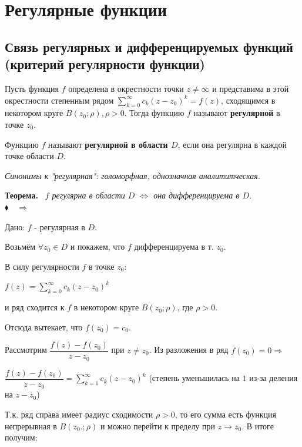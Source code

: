 \documentclass[a4paper, 12pt]{report}
\begin{document}
\par\bigskip
\section{Регулярные функции}

\subsection{Связь регулярных и дифференцируемых функций (критерий регулярности функции)}
Пусть функция $f$ определена в окрестности точки $z \ne \infty$ и представима в этой окрестности степенным рядом $\sum\limits_{k=0}^\infty c_k(z - z_0)^k = f(z)$, сходящимся в некотором круге $B(z_0; \rho), \rho > 0$. Тогда функцию $f$ называют \textbf{регулярной} в точке $z_0$. \par\bigskip
Функцию $f$ называют \textbf{регулярной в области $D$}, если она регулярна в каждой точке области $D$.

\textit{Синонимы к "регулярная": голоморфная, однозначная аналититческая.}

\bigskip \textbf{Теорема.} \ \textit{$f$ регулярна в области $D$ $\Longleftrightarrow$ она дифференцируема в $D$.} \\
$\blacklozenge \quad \Rightarrow \quad$\par Дано: \quad $f$ - регулярная в $D$. \par Возьмём $\forall z_0 \in D$ и покажем, что $f$ дифференцируема в т. $z_0$.

В силу регулярности $f$ в точке $z_0$:

\begin{center}
    $f(z) = \sum\limits_{k=0}^\infty c_k(z - z_0)^k$
\end{center}

и ряд сходится к $f$ в некотором круге $B(z_0; \rho)$, где $\rho > 0$.

Отсюда вытекает, что $f(z_0) = c_0$. 
\par\bigskip
Рассмотрим $\dfrac{f(z) - f(z_0)}{z - z_0}$ при $z \ne z_0$. Из разложения в ряд $f(z_0) = 0 \Rightarrow$

\begin{center}
    $\dfrac{f(z) - f(z_0)}{z - z_0} = \sum\limits_{k=1}^{\infty} c_k(z - z_0)^{k}$ (степень уменьшилась на $1$ из-за деления на $z - z_0$)
\end{center}

Т.к. ряд справа имеет радиус сходимости $\rho > 0$, то его сумма есть функция непрерывная в $B(z_0.; \rho)$ и можно перейти к пределу при $z \rightarrow z_0$. В итоге получим:
\end{document}
